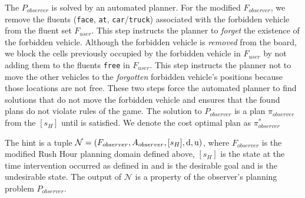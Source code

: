 The $P_{observer}$ is solved by an automated planner. 
For the modified $F_{observer}$, we remove the fluents (\texttt{face}, \texttt{at}, \texttt{car}/\texttt{truck}) associated with the forbidden vehicle from the fluent set $F_{user}$.
This step instructs the planner to \textit{forget} the existence of the forbidden vehicle.
Although the forbidden vehicle is \textit{removed} from the board, we block the cells previously occupied by the forbidden vehicle in $F_{user}$ by not adding them to the fluents \texttt{free} in $F_{user}$.
This step instructs the planner not to move the other vehicles to the \textit{forgotten} forbidden vehicle's positions because those locations are not free.
These two steps force the automated planner to find solutions that do not move the forbidden vehicle and ensures that the found plans do not violate rules of the game.
The solution to $P_{observer}$ is a plan $\pi_{observer}$ from the $[s_H]$ until \desired is satisfied.
We denote the cost optimal plan as $\pi^{*}_{observer}$

\begin{definition}
\label{def:hint}
The hint is a tuple $\mathcal{N}= (F_{observer}, A_{observer}, [s_H], \mathrm{d}, \mathrm{u})$, where $F_{observer}$ is the modified Rush Hour planning domain defined above, $[s_H]$ is the state at the time intervention occurred as defined in \historyDef and \desired is the desirable goal and \undesired is the undesirable state.
The output of $\mathcal{N}$ is a property of the observer's planning problem $P_{observer}$.
\end{definition}

